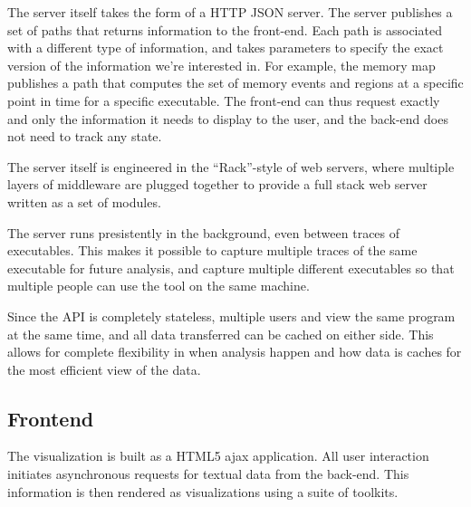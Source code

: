 \documentclass[annual]{acmsiggraph}
\begin{document}
      The server itself takes the form of a HTTP JSON server. The server publishes a set of paths that returns information to the front-end. Each path is associated with a different type of information, and takes parameters to specify the exact version of the information we're interested in. For example, the memory map publishes a path that computes the set of memory events and regions at a specific point in time for a specific executable. The front-end can thus request exactly and only the information it needs to display to the user, and the back-end does not need to track any state.
      
      The server itself is engineered in the ``Rack''-style\cite{rack} of web servers, where multiple layers of middleware are plugged together to provide a full stack web server written as a set of modules.
      
      The server runs presistently in the background, even between traces of executables. This makes it possible to capture multiple traces of the same executable for future analysis, and capture multiple different executables so that multiple people can use the tool on the same machine.
      
      Since the API is completely stateless, multiple users and view the same program at the same time, and all data transferred can be cached on either side. This allows for complete flexibility in when analysis happen and how data is caches for the most efficient view of the data.
      
          

  \subsection{Frontend}
    
    The visualization is built as a HTML5 ajax application. All user interaction initiates asynchronous requests for textual data from the back-end. This information is then rendered as visualizations using a suite of toolkits.
    
\end{document}
